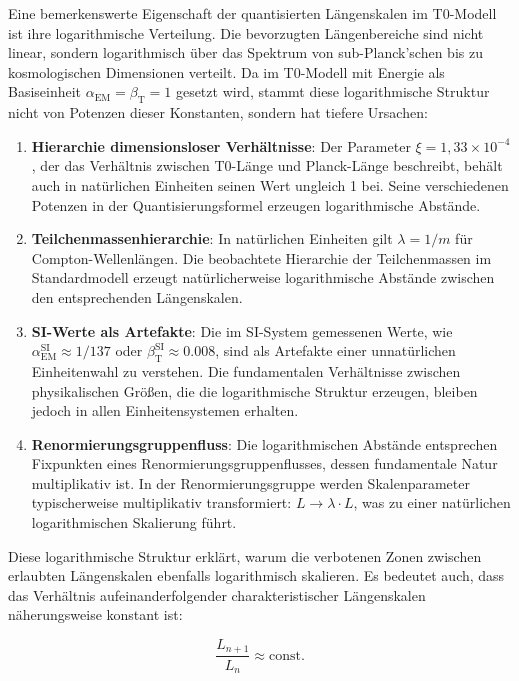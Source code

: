\documentclass[12pt,a4paper]{article}
\newcommand{\alphaEM}{\alpha_{\text{EM}}}
\newcommand{\betaT}{\beta_{\text{T}}}
\begin{document}
	Eine bemerkenswerte Eigenschaft der quantisierten Längen\-skalen im T0-Modell ist ihre logarithmische Verteilung. Die bevorzugten Längen\-bereiche sind nicht linear, sondern logarithmisch über das Spektrum von sub-Planck’schen bis zu kosmologischen Dimensionen verteilt. Da im T0-Modell mit Energie als Basis\-einheit $\alphaEM = \betaT = 1$ gesetzt wird, stammt diese logarithmische Struktur nicht von Potenzen dieser Konstanten, sondern hat tiefere Ursachen:
	
	\begin{enumerate}
		\item \textbf{Hierarchie dimensionsloser Verhältnisse}: Der Parameter $\xi = 1{,}33 \times 10^{-4}$, der das Verhältnis zwischen T0-Länge und Planck-Länge beschreibt, behält auch in natürlichen Einheiten seinen Wert ungleich 1 bei. Seine verschiedenen Potenzen in der Quantisierungs\-formel erzeugen logarithmische Abstände.
		
		\item \textbf{Teilchenmassenhierarchie}: In natürlichen Einheiten gilt $\lambda = 1/m$ für Compton-Wellenlängen. Die beobachtete Hierarchie der Teilchenmassen im Standardmodell erzeugt natürlicherweise logarithmische Abstände zwischen den entsprechenden Längen\-skalen.
		
		\item \textbf{SI-Werte als Artefakte}: Die im SI-System gemessenen Werte, wie $\alphaEM^{\text{SI}} \approx 1/137$ oder $\betaT^{\text{SI}} \approx 0.008$, sind als Artefakte einer unnatürlichen Einheitenwahl zu verstehen. Die fundamentalen Verhältnisse zwischen physikalischen Größen, die die logarithmische Struktur erzeugen, bleiben jedoch in allen Einheitensystemen erhalten.
		
		\item \textbf{Renormierungsgruppenfluss}: Die logarithmischen Abstände entsprechen Fixpunkten eines Renormierungsgruppenflusses, dessen fundamentale Natur multiplikativ ist. In der Renormierungsgruppe werden Skalenparameter typischerweise multiplikativ transformiert: $L \to \lambda \cdot L$, was zu einer natürlichen logarithmischen Skalierung führt.
	\end{enumerate}
	
	Diese logarithmische Struktur erklärt, warum die verbotenen Zonen zwischen erlaubten Längen\-skalen ebenfalls logarithmisch skalieren. Es bedeutet auch, dass das Verhältnis aufeinanderfolgender charakteristischer Längen\-skalen näherungsweise konstant ist:
	
	\begin{equation}
		\frac{L_{n+1}}{L_n} \approx \text{const.}
	\end{equation}
	
\end{document}
